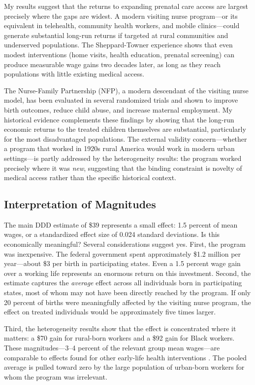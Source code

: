 \documentclass[12pt]{article}
\begin{document}
My results suggest that the returns to expanding prenatal care access are largest precisely where the gaps are widest. A modern visiting nurse program---or its equivalent in telehealth, community health workers, and mobile clinics---could generate substantial long-run returns if targeted at rural communities and underserved populations. The Sheppard-Towner experience shows that even modest interventions (home visits, health education, prenatal screening) can produce measurable wage gains two decades later, as long as they reach populations with little existing medical access.

The Nurse-Family Partnership (NFP), a modern descendant of the visiting nurse model, has been evaluated in several randomized trials and shown to improve birth outcomes, reduce child abuse, and increase maternal employment. My historical evidence complements these findings by showing that the long-run economic returns to the treated children themselves are substantial, particularly for the most disadvantaged populations. The external validity concern---whether a program that worked in 1920s rural America would work in modern urban settings---is partly addressed by the heterogeneity results: the program worked precisely where it was \textit{new}, suggesting that the binding constraint is novelty of medical access rather than the specific historical context.

\subsection{Interpretation of Magnitudes}

The main DDD estimate of \$39 represents a small effect: 1.5 percent of mean wages, or a standardized effect size of 0.024 standard deviations. Is this economically meaningful? Several considerations suggest yes. First, the program was inexpensive. The federal government spent approximately \$1.2 million per year---about \$3 per birth in participating states. Even a 1.5 percent wage gain over a working life represents an enormous return on this investment. Second, the estimate captures the \textit{average} effect across all individuals born in participating states, most of whom may not have been directly reached by the program. If only 20 percent of births were meaningfully affected by the visiting nurse program, the effect on treated individuals would be approximately five times larger.

Third, the heterogeneity results show that the effect is concentrated where it matters: a \$70 gain for rural-born workers and a \$92 gain for Black workers. These magnitudes---3--4 percent of the relevant group mean wages---are comparable to effects found for other early-life health interventions \citep{almondetal2018}. The pooled average is pulled toward zero by the large population of urban-born workers for whom the program was irrelevant.
\end{document}
